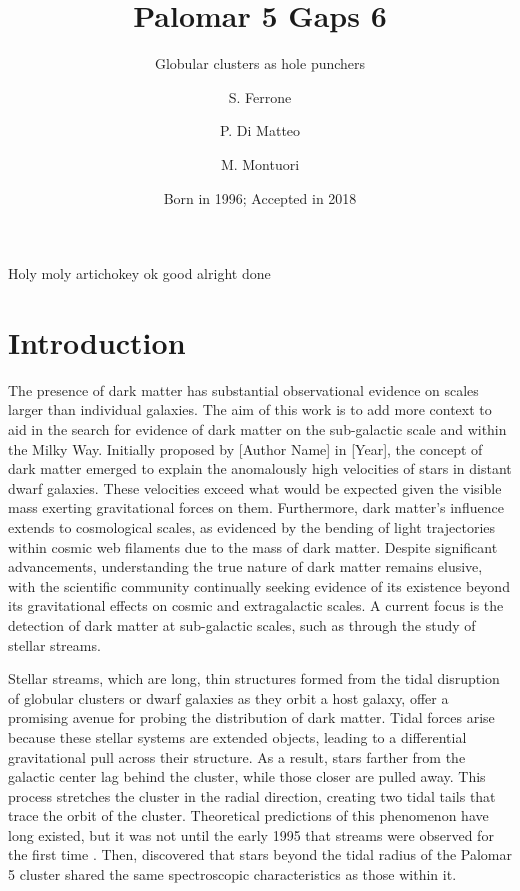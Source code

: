 \documentclass[]{aa}
\title{Palomar 5 Gaps 6}
\subtitle{Globular clusters as hole punchers}
\author{S. Ferrone
       \inst{1,2}
       \and
       P. Di Matteo\inst{2}
       \and
       M. Montuori\inst{1}
       }
\institute{Dipartimento di Fisica, Universit\`a di Roma ``La Sapienza'',
           Piazza Aldo Moro\\
           \email{salvatore.ferrone@uniroma1.it}
      \and
          Paris Observatory. Paris Sciences et Lettres\\
          \email{c.ptolemy@hipparch.uheaven.space}
          \thanks{The }
          }
\date{Born in 1996; Accepted in 2018}
\begin{document}
\abstract
  {Holy moly artichokey}
  {ok}
  {good}
  {alright}
  {done}


\maketitle
\section{Introduction}

  The presence of dark matter has substantial observational evidence on scales larger than individual galaxies. The aim of this work is to add more context to aid in the search for evidence of dark matter on the sub-galactic scale and within the Milky Way. Initially proposed by [Author Name] in [Year], the concept of dark matter emerged to explain the anomalously high velocities of stars in distant dwarf galaxies. These velocities exceed what would be expected given the visible mass exerting gravitational forces on them. Furthermore, dark matter's influence extends to cosmological scales, as evidenced by the bending of light trajectories within cosmic web filaments due to the mass of dark matter. Despite significant advancements, understanding the true nature of dark matter remains elusive, with the scientific community continually seeking evidence of its existence beyond its gravitational effects on cosmic and extragalactic scales. A current focus is the detection of dark matter at sub-galactic scales, such as through the study of stellar streams.

  Stellar streams, which are long, thin structures formed from the tidal disruption of globular clusters or dwarf galaxies as they orbit a host galaxy, offer a promising avenue for probing the distribution of dark matter. Tidal forces arise because these stellar systems are extended objects, leading to a differential gravitational pull across their structure. As a result, stars farther from the galactic center lag behind the cluster, while those closer are pulled away. This process stretches the cluster in the radial direction, creating two tidal tails that trace the orbit of the cluster. Theoretical predictions of this phenomenon have long existed, but it was not until the early 1995 that streams were observed for the first time \citet{carl_j_grillmair_globular_1995}. Then, \citet{odenkirchen_detection_2001} discovered that stars beyond the tidal radius of the Palomar 5 cluster shared the same spectroscopic characteristics as those within it.
\end{document}
